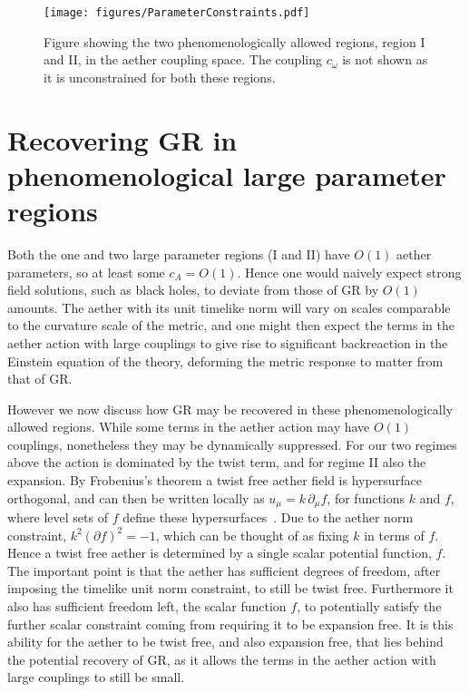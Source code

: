 \documentclass[12pt]{article}
\numberwithin{equation}{section}
\begin{document}
\begin{figure}
  \centerline{\texttt{[image: figures/ParameterConstraints.pdf]}}
  \caption{\label{fig:regions}Figure showing the two phenomenologically allowed regions, region I and II, in the aether coupling space. The coupling $c_\omega$ is not shown as it is unconstrained for both these regions.}
\end{figure}



\section{Recovering GR in phenomenological large parameter regions}
\label{sec:painting}

Both the one and two large parameter regions (I and II) have $O(1)$ aether parameters, so at least some $c_A = O(1)$. Hence one would naively expect strong field solutions, such as black holes, to deviate from those of GR by $O(1)$ amounts. The aether with its unit timelike norm will vary on scales comparable to the curvature scale of the metric, and one might then expect the terms in the aether action with large couplings  to give rise to significant backreaction in the Einstein equation of the theory, deforming the metric response to matter from that of GR.

However we now discuss how GR may be recovered in these phenomenologically allowed regions. While some terms in the aether action may have $O(1)$ couplings, nonetheless they may be dynamically suppressed. For our two regimes above the action is dominated by the twist term, and for regime II also the expansion. 
By Frobenius's theorem a twist free aether field is hypersurface orthogonal,
and can then be written locally as $u_\mu = k\, \partial_\mu f$, for functions $k$ and $f$, where level sets of $f$ define these hypersurfaces~\cite{Jacobson:2013xta}.
Due to the aether norm constraint, 
$k^2 (\partial f)^2 = -1$,
which can be thought of as fixing $k$ in terms of $f$. Hence a twist free aether is 
determined by a single scalar potential function, $f$. The important point is that the aether has sufficient degrees of freedom, after imposing the timelike unit norm constraint, to still be twist free. Furthermore it also has sufficient freedom left, the scalar function $f$, to potentially satisfy the further scalar constraint coming from requiring it to be expansion free. It is this ability for the aether to be twist free, and also expansion free, that lies behind the potential recovery of GR, as it allows the terms in the aether action with large couplings to still be small.
\end{document}
